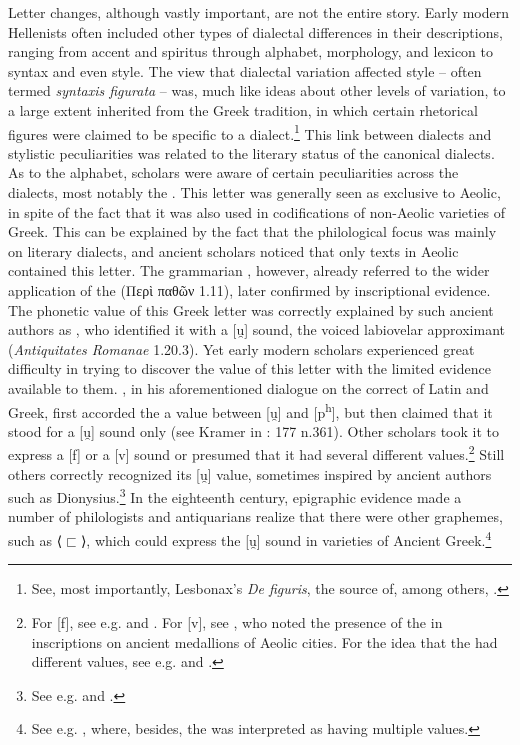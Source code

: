 Letter changes, although vastly important, are not the entire story. Early modern Hellenists often included other types of dialectal differences in their descriptions, ranging from accent and spiritus through alphabet, morphology, and lexicon to syntax and even style. The view that dialectal variation affected style – often termed \textit{syntaxis figurata} – was, much like ideas about other levels of variation, to a large extent inherited from the Greek tradition, in which certain rhetorical figures were claimed to be specific to a dialect.\footnote{{See, most importantly, Lesbonax’s} {\textit{De figuris}}{, the source of, among others, \citet[145--146]{Saumaise1643a}.}} This link between dialects and stylistic peculiarities was related to the literary status of the canonical dialects. As to the alphabet, scholars were aware of certain peculiarities across the dialects, most notably the . This letter was generally seen as exclusive to Aeolic, in spite of the fact that it was also used in codifications of non-Aeolic varieties of Greek. This can be explained by the fact that the philological focus was mainly on literary dialects, and ancient scholars noticed that only texts in Aeolic contained this letter. The grammarian , however, already referred to the wider application of the  (Περὶ παθῶν 1.11), later confirmed by inscriptional evidence. The phonetic value of this Greek letter was correctly explained by such ancient authors as , who identified it with a [u̯] sound, the voiced labiovelar approximant (\textit{Antiquitates Romanae} 1.20.3). Yet early modern scholars experienced great difficulty in trying to discover the value of this letter with the limited evidence available to them. \citet[68–69, 108]{Erasmus1528}, in his aforementioned dialogue on the correct  of Latin and Greek, first accorded the  a value between [u̯] and [p\textsuperscript{h}], but then claimed that it stood for a [u̯] sound only (see Kramer in \citealt{Erasmus1978}: 177 n.361). Other scholars took it to express a [f] or a [v] sound or presumed that it had several different values.\footnote{{For [f], see e.g. \citet[4]{Sylvius1531} and \citet[5]{Rhenius1626}. For [v], see \citet[108-109]{Freret1809}, who noted the presence of the  in inscriptions on ancient medallions of Aeolic cities. For the idea that the  had different values, see e.g. \citet[107-108]{Canini1555} and \citet[b.1{\textsc{\textsuperscript{r}}}{–b.2}{\textsc{\textsuperscript{v}}}]{ThryllitschBrunner1709}.}} Still others correctly recognized its [u̯] value, sometimes inspired by ancient authors such as Dionysius.\footnote{{See e.g. \citet[b.4{\textsc{\textsuperscript{r}}}]{KirchmaierCrusius1684} and \citet[19]{Reynolds1752}.}} In the eighteenth century, epigraphic evidence made a number of philologists and antiquarians realize that there were other graphemes, such as ⟨$⊏$⟩, which could express the [u̯] sound in varieties of Ancient Greek.\footnote{{See e.g. \citet[128-130]{Mazzocchi1754}, where, besides, the  was interpreted as having multiple values.}}


